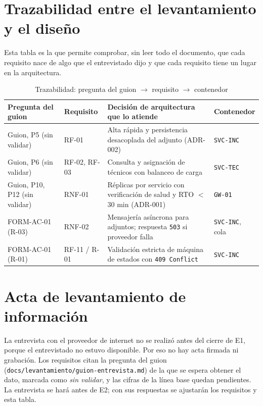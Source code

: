 ﻿\section{Trazabilidad entre el levantamiento y el diseño}
\label{anexo:trazabilidad}

Esta tabla es la que permite comprobar, sin leer todo el documento, que cada requisito nace de algo
que el entrevistado dijo y que cada requisito tiene un lugar en la arquitectura.

\begin{table}[H]
\centering
\caption{Trazabilidad: pregunta del guion $\rightarrow$ requisito $\rightarrow$ contenedor}
\label{tab:trazabilidad}
\small
\begin{tabularx}{\linewidth}{@{}llYl@{}}
\toprule
Pregunta del guion & Requisito & Decisión de arquitectura que lo atiende & Contenedor \\
\midrule
Guion, P5 (sin validar) & RF-01 & Alta rápida y persistencia desacoplada del adjunto (ADR-002) & \texttt{SVC-INC} \\
\addlinespace
Guion, P6 (sin validar) & RF-02, RF-03 & Consulta y asignación de técnicos con balanceo de carga & \texttt{SVC-TEC} \\
\addlinespace
Guion, P10, P12 (sin validar) & RNF-01 & Réplicas por servicio con verificación de salud y RTO $<$ 30 min (ADR-001) & \texttt{GW-01} \\
\addlinespace
FORM-AC-01 (R-03) & RNF-02 & Mensajería asíncrona para adjuntos; respuesta \texttt{503} si proveedor falla & \texttt{SVC-INC}, cola \\
\addlinespace
FORM-AC-01 (R-01) & RF-11 / R-01 & Validación estricta de máquina de estados con \texttt{409 Conflict} & \texttt{SVC-INC} \\
\bottomrule
\end{tabularx}
\end{table}

\section{Acta de levantamiento de información}
\label{anexo:acta}

La entrevista con el proveedor de internet no se realizó antes del cierre de E1, porque el
entrevistado no estuvo disponible. Por eso no hay acta firmada ni grabación. Los requisitos citan
la pregunta del guion (\texttt{docs/levantamiento/guion-entrevista.md}) de la que se espera
obtener el dato, marcada como \emph{sin validar}, y las cifras de la línea base quedan pendientes.
La entrevista se hará antes de E2; con sus respuestas se ajustarán los requisitos y esta tabla.

